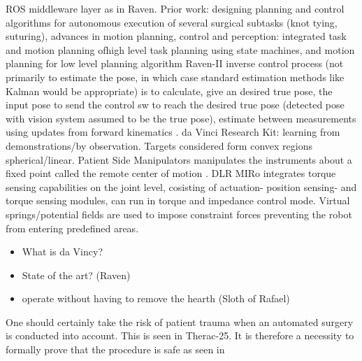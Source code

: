 ROS middleware layer as in Raven.
Prior work: designing planning and control algorithms for autonomous execution of several surgical subtasks (knot tying, suturing), advances in motion planning, control and perception: integrated task and motion planning ofhigh level task planning using state machines, and motion planning for low level planning algorithm  \citep{bib:raven_debride}
Raven-II inverse control process (not primarily to estimate the pose, in which case standard estimation methods like Kalman would be appropriate) is to calculate, give an desired true pose, the input pose to send the control sw to reach the desired true pose (detected pose with vision system assumed to be the true pose), estimate between measurements using updates from forward kinematics \citep{bib:raven_debride}.
da Vinci Research Kit: learning from demonstrations/by observation. Targets considered form convex regions spherical/linear. Patient Side Manipulators manipulates the instruments about a fixed point called the remote center of motion \citep{bib:raven_observ}.
DLR MIRo integrates torque sensing capabilities on the joint level, cosisting of actuation- position sensing- and torque sensing modules, can run in torque and impedance control mode. Virtual springs/potential fields are used to impose constraint forces preventing the robot from  entering predefined areas.

\begin{itemize}
\item What is da Vincy?
\item State of the art? (Raven)
\item operate without having to remove the hearth (Sloth of Rafael)
\end{itemize}
One should certainly take the risk of patient trauma when an automated surgery is conducted into account. This is seen in Therac-25. It is therefore a necessity to formally prove that the procedure is safe as seen in \citep{bib:safety}